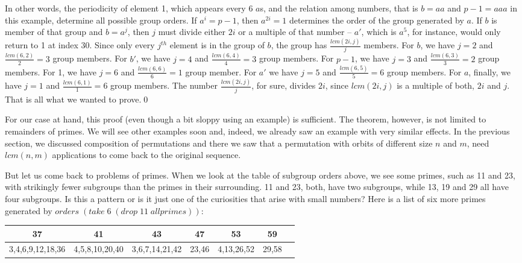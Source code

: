 \documentclass{scrreprt}
\newcommand{\Varid}[1]{\mathit{#1}}
\begin{document}
In other words, the periodicity of element 1,
which appears every 6 $a$s, and the relation
among numbers, that is $b=aa$ and $p-1=aaa$
in this example, determine all possible group orders.
If $a^i = p-1$, then $a^{2i} = 1$ determines the 
order of the group generated by $a$. 
If $b$ is member of that group and $b=a^j$, 
then $j$ must divide either $2i$ or a multiple of that number --
$a'$, which is $a^5$, for instance, would only return to 1
at index 30.
Since only every $j^{th}$ element is in the group of $b$,
the group has $\frac{lcm(2i,j)}{j}$ members. 
For $b$, we have $j=2$ and $\frac{lcm(6,2)}{2} = 3$
group members. For $b'$, we have $j=4$ and
$\frac{lcm(6,4)}{4} = 3$ group members.
For $p-1$, we have $j=3$ and
$\frac{lcm(6,3)}{3} = 2$ group members.
For 1, we have $j=6$ and
$\frac{lcm(6,6)}{6} = 1$ group member.
For $a'$ we have $j=5$ and
$\frac{lcm(6,5)}{5} = 6$ group members.
For $a$, finally, we have $j=1$ and
$\frac{lcm(6,1)}{1} = 6$ group members.
The number 
$\frac{lcm(2i,j)}{j}$, for sure,
divides $2i$, since $lcm(2i,j)$ is a multiple
of both, $2i$ and $j$.
That is all what we wanted to prove.\qed %

For our case at hand, 
this proof (even though a bit sloppy using an example)
is sufficient.
The theorem, however, is not limited to 
remainders of primes.
We will see other examples soon and, indeed,
we already saw an example with very similar
effects. In the previous section,
we discussed composition of permutations
and there we saw that a permutation
with orbits of different size $n$ and $m$,
need $lcm(n,m)$ applications to come
back to the original sequence.

But let us come back to problems of primes.
When we look at the table of subgroup orders above,
we see some primes, such as 11 and 23, with 
strikingly fewer subgroups than the primes
in their surrounding. 11 and 23, both, have
two subgroups, while 13, 19 and 29 all have
four subgroups. Is this a pattern or is it
just one of the curiosities that arise
with small numbers?
Here is a list of six more primes
generated by \ensuremath{\Varid{orders}\;(\Varid{take}\;\mathrm{6}\;(\Varid{drop}\;\mathrm{11}\;\Varid{allprimes}))}:

\begin{tabular}{c|c|c|c|c|c|c}
           37    & 41             &  43            &    47 &         53 &    59 \\\hline
3,4,6,9,12,18,36 & 4,5,8,10,20,40 & 3,6,7,14,21,42 & 23,46 & 4,13,26,52 & 29,58
\end{tabular}
\end{document}
